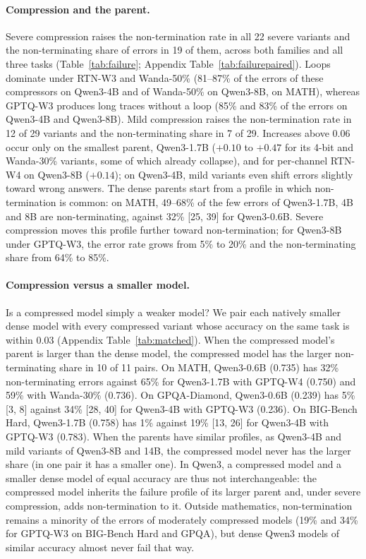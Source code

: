 \documentclass[10pt]{article}
\begin{document}
\paragraph{Compression and the parent.}
Severe compression raises the non-termination rate in all 22 severe variants and the non-terminating share of errors in 19 of them, across both families and all three tasks (Table~\ref{tab:failure}; Appendix Table~\ref{tab:failurepaired}). Loops dominate under RTN-W3 and Wanda-50\% (81--87\% of the errors of these compressors on Qwen3-4B and of Wanda-50\% on Qwen3-8B, on MATH), whereas GPTQ-W3 produces long traces without a loop (85\% and 83\% of the errors on Qwen3-4B and Qwen3-8B). Mild compression raises the non-termination rate in 12 of 29 variants and the non-terminating share in 7 of 29. Increases above 0.06 occur only on the smallest parent, Qwen3-1.7B ($+0.10$ to $+0.47$ for its 4-bit and Wanda-30\% variants, some of which already collapse), and for per-channel RTN-W4 on Qwen3-8B ($+0.14$); on Qwen3-4B, mild variants even shift errors slightly toward wrong answers. The dense parents start from a profile in which non-termination is common: on MATH, 49--68\% of the few errors of Qwen3-1.7B, 4B and 8B are non-terminating, against 32\% [25, 39] for Qwen3-0.6B. Severe compression moves this profile further toward non-termination; for Qwen3-8B under GPTQ-W3, the error rate grows from 5\% to 20\% and the non-terminating share from 64\% to 85\%.

\paragraph{Compression versus a smaller model.}
Is a compressed model simply a weaker model? We pair each natively smaller dense model with every compressed variant whose accuracy on the same task is within 0.03 (Appendix Table~\ref{tab:matched}). When the compressed model's parent is larger than the dense model, the compressed model has the larger non-terminating share in 10 of 11 pairs. On MATH, Qwen3-0.6B (0.735) has 32\% non-terminating errors against 65\% for Qwen3-1.7B with GPTQ-W4 (0.750) and 59\% with Wanda-30\% (0.736). On GPQA-Diamond, Qwen3-0.6B (0.239) has 5\% [3, 8] against 34\% [28, 40] for Qwen3-4B with GPTQ-W3 (0.236). On BIG-Bench Hard, Qwen3-1.7B (0.758) has 1\% against 19\% [13, 26] for Qwen3-4B with GPTQ-W3 (0.783). When the parents have similar profiles, as Qwen3-4B and mild variants of Qwen3-8B and 14B, the compressed model never has the larger share (in one pair it has a smaller one). In Qwen3, a compressed model and a smaller dense model of equal accuracy are thus not interchangeable: the compressed model inherits the failure profile of its larger parent and, under severe compression, adds non-termination to it. Outside mathematics, non-termination remains a minority of the errors of moderately compressed models (19\% and 34\% for GPTQ-W3 on BIG-Bench Hard and GPQA), but dense Qwen3 models of similar accuracy almost never fail that way.
\end{document}
